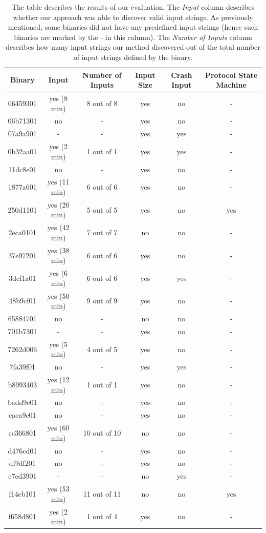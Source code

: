 \documentclass{sig-alternate-05-2015}
\begin{document}
\begin{table}
\centering
\begin{tabular}{|c|c|c|c|c|c|} \hline
\textbf{Binary} & \textbf{Input} & \textbf{Number of Inputs} & \textbf{Input Size} & \textbf{Crash Input} & \textbf{Protocol State Machine}\\ \hline
06459301 & yes (8 min) & 8 out of 8 & yes & no & -\\ \hline
06b71301 & no & - & yes & no & -\\ \hline
07a9a901 & - & - & yes & yes & - \\ \hline
0b32aa01 & yes (2 min) & 1 out of 1 & yes & yes & - \\ \hline
11dc8e01 & no & - & yes & no & - \\ \hline
1877a601 & yes (11 min) & 6 out of 6 & yes & no & - \\ \hline
250d1101 & yes (20 min) & 5 out of 5 & yes & no & yes \\ \hline
2eca0101 & yes (42 min) & 7 out of 7 & no & no & - \\ \hline
37e97201 & yes (38 min) & 6 out of 6 & yes & no & - \\ \hline
3dcf1a01 & yes (6 min) & 6 out of 6 & yes & yes & - \\ \hline
48b9cf01 & yes (50 min) & 9 out of 9 & yes & no & - \\ \hline
65884701 & no & - & no & no & - \\ \hline
701b7301 & - & - & yes & no & - \\ \hline
7262d006 & yes (5 min) & 4 out of 5 & yes & no & - \\ \hline
7fa39f01 & no & - & yes & yes & - \\ \hline
b8993403 & yes (12 min) & 1 out of 1 & yes & no & - \\ \hline
badd9e01 & no & - & yes & no & - \\ \hline
caea9c01 & no & - & yes & no &  -\\ \hline
cc366801 & yes (60 min) & 10 out of 10& no & no & - \\ \hline
d476cd01 & no & - & yes & no & - \\ \hline
df9df201 & no & - & yes & no & - \\ \hline
e7cd3901 & - & - & no & yes & - \\ \hline
f14eb101 & yes (53 min) & 11 out of 11 & no & no & yes \\ \hline
f658d801 & yes (2 min) & 1 out of 4 & yes & no & - \\
\hline\end{tabular}
\caption{The table describes the results of our evaluation. The \textit{Input} column describes whether our approach was able to discover valid input strings. As previously mentioned, some binaries did not have any predefined input strings (hence such binaries are marked by the \textit{-} in this column). The \textit{Number of Inputs} column describes how many input strings our method discovered out of the total number of input strings defined by the binary.}
\label{binaryresults}
\end{table}
\end{document}
